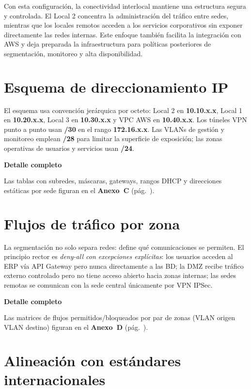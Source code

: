 \documentclass[11pt, a4paper, oneside]{report}
\newenvironment{notabox}[1]{%
  \begin{lrbox}{\notaboxsb}%
  \begin{minipage}{\dimexpr\textwidth-2\fboxsep\relax}%
  \vspace{4pt}\textcolor{upeu_dark}{\textbf{#1}}\\[2pt]\small%
}{%
  \vspace{4pt}%
  \end{minipage}%
  \end{lrbox}%
  \vspace{6pt}\par\noindent\colorbox{upeu_light}{\usebox{\notaboxsb}}\par\vspace{6pt}%
}
\begin{document}
Con esta configuración, la conectividad interlocal mantiene una estructura segura y controlada. El Local 2 concentra la administración del tráfico entre sedes, mientras que los locales remotos acceden a los servicios corporativos sin exponer directamente las redes internas. Este enfoque también facilita la integración con AWS y deja preparada la infraestructura para políticas posteriores de segmentación, monitoreo y alta disponibilidad.

\section{Esquema de direccionamiento IP}

El esquema usa convención jerárquica por octeto: Local 2 en \textbf{10.10.x.x}, Local 1 en \textbf{10.20.x.x}, Local 3 en \textbf{10.30.x.x} y VPC AWS en \textbf{10.40.x.x}. Los túneles VPN punto a punto usan \textbf{/30} en el rango \textbf{172.16.x.x}. Las VLANs de gestión y monitoreo emplean \textbf{/28} para limitar la superficie de exposición; las zonas operativas de usuarios y servicios usan \textbf{/24}.

\begin{notabox}{Detalle completo}
Las tablas con subredes, máscaras, gateways, rangos DHCP y direcciones estáticas por sede figuran en el \textbf{Anexo~C} (pág.~\pageref{anex:ip}).
\end{notabox}
\section{Flujos de tráfico por zona}

La segmentación no solo separa redes: define qué comunicaciones se permiten. El principio rector es \textit{deny-all con excepciones explícitas}: los usuarios acceden al ERP vía API Gateway pero nunca directamente a las BD; la DMZ recibe tráfico externo controlado pero no tiene acceso abierto hacia zonas internas; las sedes remotas se comunican con la sede central únicamente por VPN IPSec.

\begin{notabox}{Detalle completo}
Las matrices de flujos permitidos/bloqueados por par de zonas (VLAN origen \textrightarrow{} VLAN destino) figuran en el \textbf{Anexo~D} (pág.~\pageref{anex:flujos}).
\end{notabox}
\section{Alineación con estándares internacionales}
\end{document}
